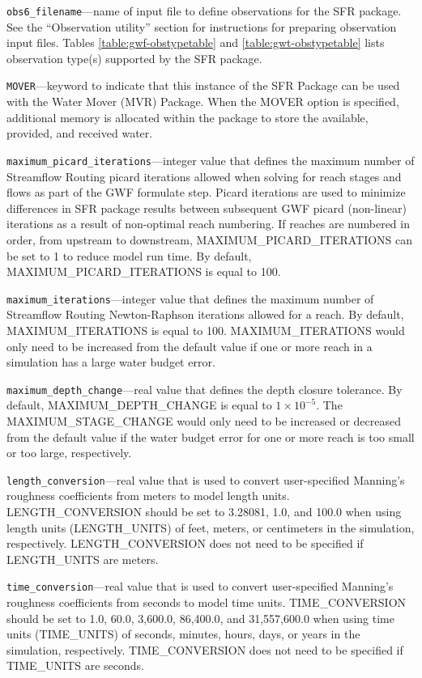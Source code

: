 \begin{description}
\item \texttt{obs6\_filename}---name of input file to define observations for the SFR package. See the ``Observation utility'' section for instructions for preparing observation input files. Tables \ref{table:gwf-obstypetable} and \ref{table:gwt-obstypetable} lists observation type(s) supported by the SFR package.

\item \texttt{MOVER}---keyword to indicate that this instance of the SFR Package can be used with the Water Mover (MVR) Package.  When the MOVER option is specified, additional memory is allocated within the package to store the available, provided, and received water.

\item \texttt{maximum\_picard\_iterations}---integer value that defines the maximum number of Streamflow Routing picard iterations allowed when solving for reach stages and flows as part of the GWF formulate step. Picard iterations are used to minimize differences in SFR package results between subsequent GWF picard (non-linear) iterations as a result of non-optimal reach numbering. If reaches are numbered in order, from upstream to downstream, MAXIMUM\_PICARD\_ITERATIONS can be set to 1 to reduce model run time. By default, MAXIMUM\_PICARD\_ITERATIONS is equal to 100.

\item \texttt{maximum\_iterations}---integer value that defines the maximum number of Streamflow Routing Newton-Raphson iterations allowed for a reach. By default, MAXIMUM\_ITERATIONS is equal to 100. MAXIMUM\_ITERATIONS would only need to be increased from the default value if one or more reach in a simulation has a large water budget error.

\item \texttt{maximum\_depth\_change}---real value that defines the depth closure tolerance. By default, MAXIMUM\_DEPTH\_CHANGE is equal to $1 \times 10^{-5}$. The MAXIMUM\_STAGE\_CHANGE would only need to be increased or decreased from the default value if the water budget error for one or more reach is too small or too large, respectively.

\item \texttt{length\_conversion}---real value that is used to convert user-specified Manning's roughness coefficients from meters to model length units. LENGTH\_CONVERSION should be set to 3.28081, 1.0, and 100.0 when using length units (LENGTH\_UNITS) of feet, meters, or centimeters in the simulation, respectively. LENGTH\_CONVERSION does not need to be specified if LENGTH\_UNITS are meters.

\item \texttt{time\_conversion}---real value that is used to convert user-specified Manning's roughness coefficients from seconds to model time units. TIME\_CONVERSION should be set to 1.0, 60.0, 3,600.0, 86,400.0, and 31,557,600.0 when using time units (TIME\_UNITS) of seconds, minutes, hours, days, or years in the simulation, respectively. TIME\_CONVERSION does not need to be specified if TIME\_UNITS are seconds.

\end{description}
